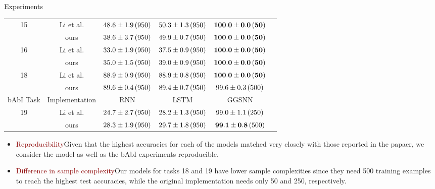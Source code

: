 \documentclass[final,hyperref={pdfpagelabels=false}]{beamer}
\begin{document}
\begin{frame}[t]
\begin{columns}[t]
\begin{column}{.3\textwidth}
\begin{block}{Experiments}
\begin{table}[t]
\begin{tabular}{cccccc}
              \multirow{2}{*}{15} & Li et al. &  $48.6 \pm 1.9\thinspace (950)$ & $50.3 \pm 1.3\thinspace (950)$ & $\mathbf{100.0 \pm 0.0\thinspace (50)}$  \\
              & ours & $38.6 \pm 3.7\thinspace (950)$ & $49.9 \pm 0.7\thinspace (950)$ & $\mathbf{100.0 \pm 0.0\thinspace (50)}$ \\  \midrule
        
              \multirow{2}{*}{16} & Li et al. &  $33.0 \pm 1.9\thinspace (950)$&  $37.5 \pm 0.9\thinspace (950)$ & $\mathbf{100.0 \pm 0.0\thinspace (50)}$  \\
              & ours & $35.0 \pm 1.5\thinspace (950)$ & $39.0 \pm 0.9\thinspace (950)$ & $\mathbf{100.0 \pm 0.0\thinspace (50)}$ \\  \midrule
        
              \multirow{2}{*}{18} & Li et al. & $88.9 \pm 0.9\thinspace (950)$ & $88.9 \pm 0.8\thinspace (950)$ & $\mathbf{100.0 \pm 0.0\thinspace (50)}$ \\
              & ours & $89.6 \pm 0.4\thinspace (950)$ & $89.4 \pm 0.7\thinspace (950)$ & $99.6\pm 0.3\thinspace (500)$\\ \midrule
              
              bAbI Task & Implementation & RNN & LSTM & GGSNN \\  \midrule
              
              \multirow{2}{*}{19} & Li et al. & $24.7 \pm 2.7\thinspace (950)$ & $28.2 \pm 1.3\thinspace (950)$ & $99.0\pm1.1\thinspace (250)$\\ 
              & ours & $28.3 \pm 1.9\thinspace (950)$ & $29.7 \pm 1.8\thinspace (950)$ & $\mathbf{99.1\pm 0.8}\thinspace (500)$\\ \bottomrule
        \end{tabular}
        \end{table}
        \vspace{0.2in}
        
    \begin{itemize}
        \item \textcolor{darkred}{Reproducibility}\thinspace Given that the highest accuracies for each of the models matched very closely with those reported in the papaer, we consider the model as well as the bAbI experiments reproducible.
        \item \textcolor{darkred}{Difference in sample complexity}\thinspace Our models for tasks 18 and 19 have lower sample complexities since they need 500 training examples to reach the highest test accuracies, while the original implementation needs only 50 and 250, respectively.
    \end{itemize}
    \end{block}
    

\end{column}
\end{columns}
\end{frame}
\end{document}
